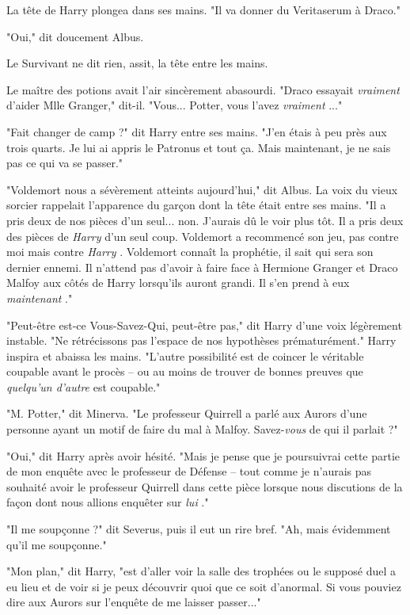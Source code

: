 La tête de Harry plongea dans ses mains. "Il va donner du Veritaserum à Draco."

"Oui," dit doucement Albus.

Le Survivant ne dit rien, assit, la tête entre les mains.

Le maître des potions avait l'air sincèrement abasourdi. "Draco essayait \emph{vraiment}  d'aider Mlle Granger," dit-il. "Vous... Potter, vous l'avez \emph{vraiment} ..."

"Fait changer de camp ?" dit Harry entre ses mains. "J'en étais à peu près aux trois quarts. Je lui ai appris le Patronus et tout ça. Mais maintenant, je ne sais pas ce qui va se passer."

"Voldemort nous a sévèrement atteints aujourd'hui," dit Albus. La voix du vieux sorcier rappelait l'apparence du garçon dont la tête était entre ses mains. "Il a pris deux de nos pièces d'un seul... non. J'aurais dû le voir plus tôt. Il a pris deux des pièces de \emph{Harry}  d'un seul coup. Voldemort a recommencé son jeu, pas contre moi mais contre \emph{Harry} . Voldemort connaît la prophétie, il sait qui sera son dernier ennemi. Il n'attend pas d'avoir à faire face à Hermione Granger et Draco Malfoy aux côtés de Harry lorsqu'ils auront grandi. Il s'en prend à eux \emph{maintenant} ."

"Peut-être est-ce Vous-Savez-Qui, peut-être pas," dit Harry d'une voix légèrement instable. "Ne rétrécissons pas l'espace de nos hypothèses prématurément." Harry inspira et abaissa les mains. "L'autre possibilité est de coincer le véritable coupable avant le procès – ou au moins de trouver de bonnes preuves que \emph{quelqu'un d'autre}  est coupable."

"M. Potter," dit Minerva. "Le professeur Quirrell a parlé aux Aurors d'une personne ayant un motif de faire du mal à Malfoy. Savez-\emph{vous}  de qui il parlait ?"

"Oui," dit Harry après avoir hésité. "Mais je pense que je poursuivrai cette partie de mon enquête avec le professeur de Défense – tout comme je n'aurais pas souhaité avoir le professeur Quirrell dans cette pièce lorsque nous discutions de la façon dont nous allions enquêter sur \emph{lui} ."

"Il me soupçonne ?" dit Severus, puis il eut un rire bref. "Ah, mais évidemment qu'il me soupçonne."

"Mon plan," dit Harry, "est d'aller voir la salle des trophées ou le supposé duel a eu lieu et de voir si je peux découvrir quoi que ce soit d'anormal. Si vous pouviez dire aux Aurors sur l'enquête de me laisser passer..."

